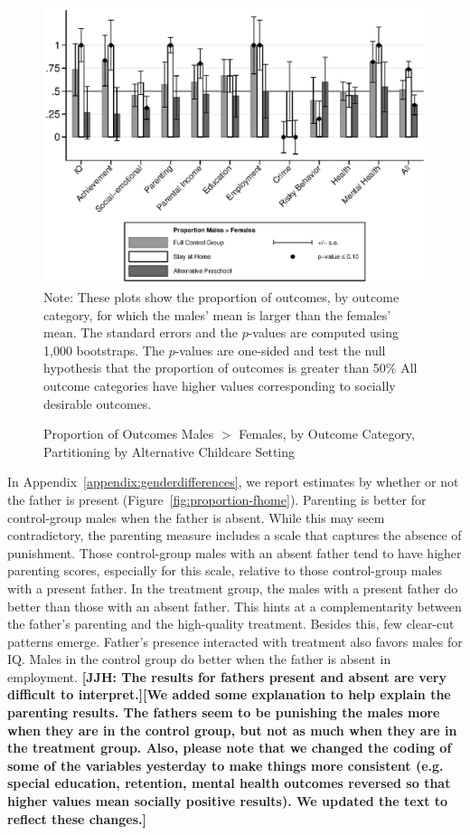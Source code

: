 \begin{figure}[H]
\centering
\caption{Proportion of Outcomes Males $>$ Females, by Outcome Category, Partitioning by Alternative Childcare Setting}
\label{fig:proportion-altpre}
	\includegraphics[width=\textwidth]{output/gendergaps-control-moderated-altpre}
\footnotesize \justify
Note: These plots show the proportion of outcomes, by outcome category, for which the males' mean is larger than the females' mean. The standard errors and the $p$-values are computed using 1,000 bootstraps. The $p$-values are one-sided and test the null hypothesis that the proportion of outcomes is greater than 50\% All outcome categories have higher values corresponding to socially desirable outcomes.
\end{figure}

In Appendix~\ref{appendix:genderdifferences}, we report estimates by whether or not the father is present (Figure~\ref{fig:proportion-fhome}). Parenting is better for control-group males when the father is absent. While this may seem contradictory, the parenting measure includes a scale that captures the absence of punishment. Those control-group males with an absent father tend to have higher parenting scores, especially for this scale, relative to those control-group males with a present father. In the treatment group, the males with a present father do better than those with an absent father. This hints at a complementarity between the father's parenting and the high-quality treatment. Besides this, few clear-cut patterns emerge. Father's presence interacted with treatment also favors males for IQ. Males in the control group do better when the father is absent in employment. \textbf{[JJH: The results for fathers present and absent are very difficult to interpret.][We added some explanation to help explain the parenting results. The fathers seem to be punishing the males more when they are in the control group, but not as much when they are in the treatment group. Also, please note that we changed the coding of some of the variables yesterday to make things more consistent (e.g. special education, retention, mental health outcomes reversed so that higher values mean socially positive results). We updated the text to reflect these changes.]}

